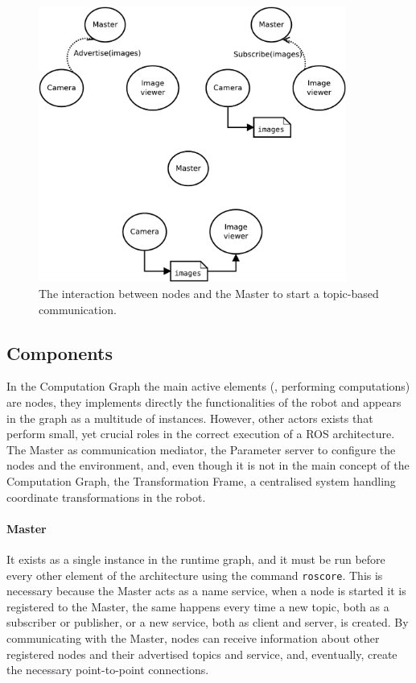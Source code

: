 \begin{figure}[t]
    \centering
    \includegraphics[width=0.9\textwidth]{gfx/ros/master_t}
    \caption{The interaction between nodes and the Master to start a topic-based communication.}\label{fig:ros-master}
\end{figure}

\subsection{Components}
In the Computation Graph the main active elements (\ie, performing computations) are nodes, they implements directly the functionalities of the robot and appears in the graph as a multitude of instances. However, other actors exists that perform small, yet crucial roles in the correct execution of a ROS architecture. The Master as communication mediator, the Parameter server to configure the nodes and the environment, and, even though it is not in the main concept of the Computation Graph, the Transformation Frame, a centralised system handling coordinate transformations in the robot.

\paragraph{Master} It exists as a single instance in the runtime graph, and it must be run before every other element of the architecture using the command \texttt{roscore}. This is necessary because the Master acts as a name service, when a node is started it is registered to the Master, the same happens every time a new topic, both as a subscriber or publisher, or a new service, both as client and server,  is created. By communicating with the Master, nodes can receive information about other registered nodes and their advertised topics and service, and, eventually, create the necessary point-to-point connections.


